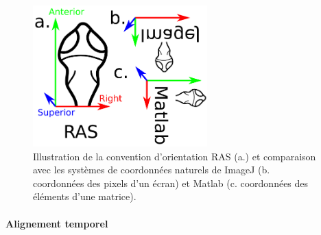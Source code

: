 \begin{figure}
\centering
\includegraphics[width=0.6\textwidth]{./files/RAST.svg.png}
\caption{Illustration de la convention d'orientation RAS (a.) et comparaison avec les systèmes de coordonnées naturels de ImageJ (b. coordonnées des pixels d'un écran) et Matlab (c. coordonnées des éléments d'une matrice).}
\end{figure}


\paragraph{Alignement temporel}


